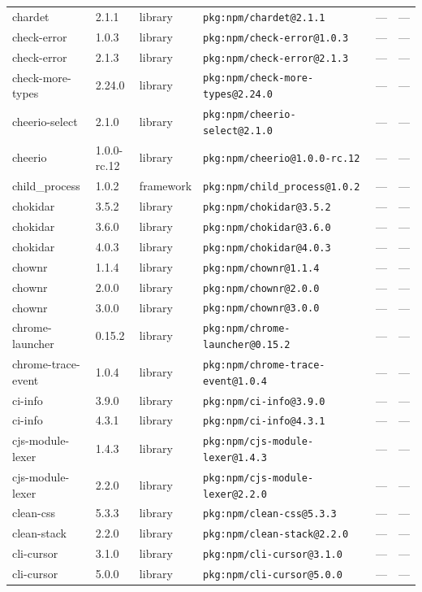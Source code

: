 \documentclass[11pt]{article}
\begin{document}
\begin{longtable}{|l|l|l|p{2.2cm}|l|p{4cm}|}
chardet & 2.1.1 & library & \texttt{pkg:npm/chardet@2.1.1} & — & — \\
check-error & 1.0.3 & library & \texttt{pkg:npm/check-error@1.0.3} & — & — \\
check-error & 2.1.3 & library & \texttt{pkg:npm/check-error@2.1.3} & — & — \\
check-more-types & 2.24.0 & library & \texttt{pkg:npm/check-more-types@2.24.0} & — & — \\
cheerio-select & 2.1.0 & library & \texttt{pkg:npm/cheerio-select@2.1.0} & — & — \\
cheerio & 1.0.0-rc.12 & library & \texttt{pkg:npm/cheerio@1.0.0-rc.12} & — & — \\
child\_process & 1.0.2 & framework & \texttt{pkg:npm/child\_process@1.0.2} & — & — \\
chokidar & 3.5.2 & library & \texttt{pkg:npm/chokidar@3.5.2} & — & — \\
chokidar & 3.6.0 & library & \texttt{pkg:npm/chokidar@3.6.0} & — & — \\
chokidar & 4.0.3 & library & \texttt{pkg:npm/chokidar@4.0.3} & — & — \\
chownr & 1.1.4 & library & \texttt{pkg:npm/chownr@1.1.4} & — & — \\
chownr & 2.0.0 & library & \texttt{pkg:npm/chownr@2.0.0} & — & — \\
chownr & 3.0.0 & library & \texttt{pkg:npm/chownr@3.0.0} & — & — \\
chrome-launcher & 0.15.2 & library & \texttt{pkg:npm/chrome-launcher@0.15.2} & — & — \\
chrome-trace-event & 1.0.4 & library & \texttt{pkg:npm/chrome-trace-event@1.0.4} & — & — \\
ci-info & 3.9.0 & library & \texttt{pkg:npm/ci-info@3.9.0} & — & — \\
ci-info & 4.3.1 & library & \texttt{pkg:npm/ci-info@4.3.1} & — & — \\
cjs-module-lexer & 1.4.3 & library & \texttt{pkg:npm/cjs-module-lexer@1.4.3} & — & — \\
cjs-module-lexer & 2.2.0 & library & \texttt{pkg:npm/cjs-module-lexer@2.2.0} & — & — \\
clean-css & 5.3.3 & library & \texttt{pkg:npm/clean-css@5.3.3} & — & — \\
clean-stack & 2.2.0 & library & \texttt{pkg:npm/clean-stack@2.2.0} & — & — \\
cli-cursor & 3.1.0 & library & \texttt{pkg:npm/cli-cursor@3.1.0} & — & — \\
cli-cursor & 5.0.0 & library & \texttt{pkg:npm/cli-cursor@5.0.0} & — & — \\

\end{longtable}
\end{document}
